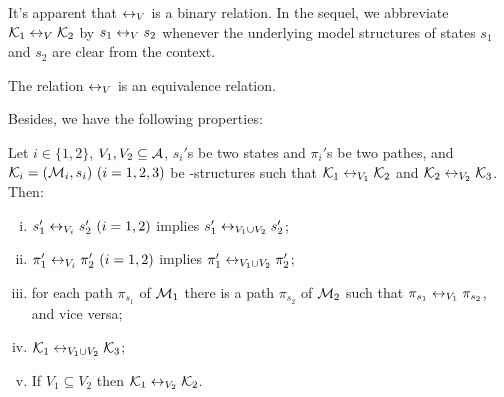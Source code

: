 \documentclass{article}
\begin{document}


It's apparent that $\leftrightarrow_V$ is a binary relation.
 In the sequel, we abbreviate ${\cal K}_1 \leftrightarrow_V {\cal K}_2$
 by $s_1 \leftrightarrow_V s_2 $
 whenever the underlying model structures of states $s_1$ and $s_2$ are clear from the context.%
\begin{lemma}\label{lem:equive}
  The relation $\leftrightarrow_V$ is an equivalence relation.
\end{lemma}

Besides, we have the following properties:
\begin{proposition}\label{div}
Let $i\in \{1,2\}$, $V_1,V_2\subseteq\cal A$, $s_i'$s be two states and
  $\pi_i'$s be two pathes,
and ${\cal K}_i=({\cal M}_i,s_i)~(i=1,2,3)$ be \MPK-structures
 such that
${\cal K}_1\leftrightarrow_{V_1}{\cal K}_2$ and ${\cal K}_2\leftrightarrow_{V_2}{\cal K}_3$.
 Then:
 \begin{enumerate}[(i)]
   \item $s_1'\leftrightarrow_{V_i}s_2'~(i=1,2)$ implies $s_1'\leftrightarrow_{V_1\cup V_2}s_2'$;
   \item $\pi_1'\leftrightarrow_{V_i}\pi_2'~(i=1,2)$ implies $\pi_1'\leftrightarrow_{V_1\cup V_2}\pi_2'$;
   \item for each path $\pi_{s_1}$ of ${\cal M}_1$ there is a path $\pi_{s_2}$  of ${\cal M}_2$ such that $\pi_{s_1} \leftrightarrow_{V_1} \pi_{s_2}$, and vice versa;
   \item ${\cal K}_1\leftrightarrow_{V_1\cup V_2}{\cal K}_3$;
   \item If $V_1 \subseteq V_2$ then ${\cal K}_1 \leftrightarrow_{V_2} {\cal K}_2$.
 \end{enumerate}
\end{proposition}
\end{document}
